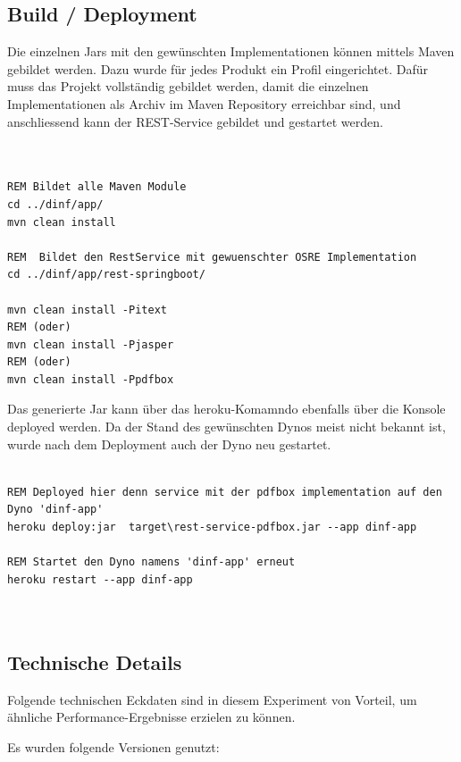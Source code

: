 \documentclass[main.tex]{subfiles}
\begin{document}
\subsection{Build / Deployment}

Die einzelnen Jars mit den gewünschten Implementationen können mittels Maven gebildet werden. Dazu wurde für jedes Produkt ein Profil eingerichtet. Dafür muss das Projekt vollständig gebildet werden, damit die einzelnen Implementationen als Archiv im Maven Repository erreichbar sind, und anschliessend kann der REST-Service gebildet und gestartet werden.  

\begin{lstlisting}[language=command.com]


REM Bildet alle Maven Module 
cd ../dinf/app/ 
mvn clean install 

REM  Bildet den RestService mit gewuenschter OSRE Implementation     
cd ../dinf/app/rest-springboot/

mvn clean install -Pitext
REM (oder)
mvn clean install -Pjasper
REM (oder)
mvn clean install -Ppdfbox
\end{lstlisting}


Das generierte Jar kann über das heroku-Komamndo ebenfalls über die Konsole deployed werden. Da der Stand des gewünschten Dynos meist nicht bekannt ist, wurde nach dem Deployment auch der Dyno neu gestartet. 

\begin{lstlisting}[language=command.com]

REM Deployed hier denn service mit der pdfbox implementation auf den Dyno 'dinf-app'
heroku deploy:jar  target\rest-service-pdfbox.jar --app dinf-app

REM Startet den Dyno namens 'dinf-app' erneut
heroku restart --app dinf-app



\end{lstlisting}

\subsection{Technische Details}

Folgende technischen Eckdaten sind in diesem Experiment von Vorteil, um ähnliche Performance-Ergebnisse erzielen zu können. 

Es wurden folgende Versionen genutzt: 
\end{document}
